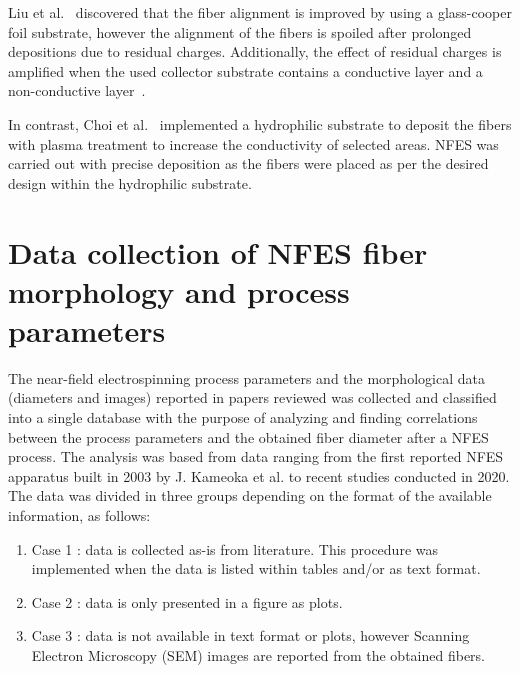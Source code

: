 Liu et al.\unskip~\cite{527120:11974315} discovered that the fiber alignment is improved by using a glass-cooper foil substrate, however the alignment of the fibers is spoiled after prolonged depositions due to residual charges. Additionally, the effect of residual charges is amplified when the used collector substrate contains a conductive layer and a non-conductive layer\unskip~\cite{527120:11974315}.

In contrast, Choi et al.\unskip~\cite{527120:12322289} implemented a hydrophilic substrate to deposit the fibers with plasma treatment to increase the conductivity of selected areas. NFES was carried out with precise deposition as the fibers were placed as per the desired design within the hydrophilic substrate.

\section{Data collection of NFES fiber morphology and process parameters}

The near-field electrospinning process parameters and the morphological data (diameters and images) reported in papers reviewed was collected and classified into a single database with the purpose of analyzing and finding correlations between the process parameters and the obtained fiber diameter after a NFES process. The analysis was based from data ranging from the first reported NFES apparatus built in 2003 by J. Kameoka et al. \cite{Kameoka2003a} to recent studies conducted in 2020. \cite{
  Yang2019,Fattahi2017,Shin2019,Wang2015,Parajuli2016,Zheng2010,Fuh2011,Dalton2015,
  Ru2014,Xue2014,Wang2017,Xu2014,Liu2013,Pan2014,Canton2014,Chakraborty2009,Gupta2007,
  He2018,Zhou2011,Chen2013,Williams2018,Choi2017,Pan2019,Lei2015,Lim2019,Park2020,
  Fuh2012,Flores2017,Chang2010,Xu2019,Zhang2019,Shin2018,Fuh2015,Nagle2019,Zheng2012,
  Kameoka2003a,Liu2014,E.King2019,Hochleitner2017,Madou2011,Jiang2018,Husain2016,
  ElectrospinTech2015,Brown2011,Kolan2018,Chang2011,Beachley2011,Camillo2013,Kameoka2003,
  Bu2012,Lee2012,Huang2015,Coppola2020,CisquellaSerra2019,Ruggieri2013,Hochleitner2014,
  Zhu2016,Brown2014,Chang2008,Sonntag2020,Kim2018,Deng2020,Han2019,George2020,Sun2006a,
  Pan2015,Shen2016,Strauss2019,Fuh2013,Sarkar2007,You2017,Wang2018a,Zheng2014,Song2015,
  GaofengZheng2010,Liu2015a,Min2013,Luo2016,Yousefi2019,Cardenas2017,Coppola2014} The data was divided in three groups depending on the format of the available information, as follows:

\begin{enumerate}
\item Case 1 : data is collected as-is from literature. This procedure was implemented when the data is listed within tables and/or as text format.
\item Case 2 : data is only presented in a figure as plots.
\item Case 3 : data is not available in text format or plots, however Scanning Electron Microscopy (SEM) images are reported from the obtained fibers.
\end{enumerate}

